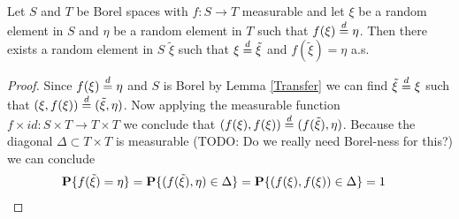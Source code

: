 \begin{lem}\label{SolvingStochasticEquations}Let $S$ and $T$ be Borel spaces with $f : S \to T$
  measurable and let $\xi$ be a random
  element in $S$ and $\eta$ be a random element in $T$ such that
  $f(\xi) \overset{d}= \eta$.  Then there exists a random element in $S$
  $\tilde{\xi}$ such that $\xi \overset{d}= \tilde{\xi}$ and $f(\tilde{\xi}) = \eta$ a.s.
\end{lem}
\begin{proof}
Since $f(\xi) \overset{d}= \eta$ and $S$ is Borel by Lemma \ref{Transfer}
we can find $\tilde{\xi} \overset{d}= \xi$ such that $(\xi, f(\xi)) \overset{d}=
(\tilde{\xi}, \eta)$.  Now applying the measurable function $f \times
id : S \times T \to T \times T$ we conclude that $(f(\xi), f(\xi))
\overset{d}= (f(\tilde{\xi}), \eta)$.  Because the diagonal $\Delta \subset
T \times T$ is measurable (TODO: Do we really need Borel-ness for
this?) we can conclude 
\begin{align*}
\textbf{P}\{f(\tilde{\xi}) = \eta\} &= \textbf{P}\{(f(\tilde{\xi}),
  \eta) \in \Delta\} = 
\textbf{P}\{(f(\xi), f(\xi)) \in \Delta\} =1
\end{align*}
\end{proof}



